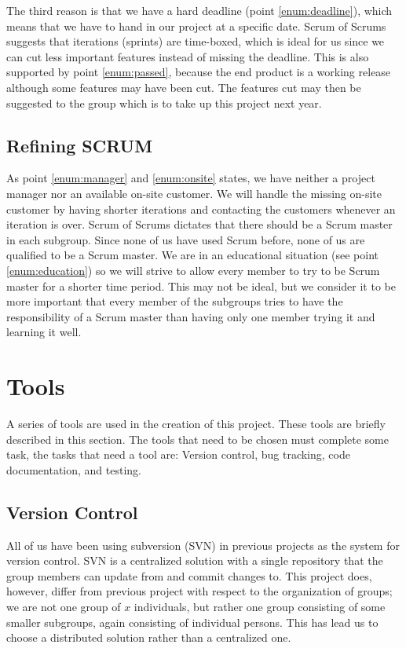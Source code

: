 The third reason is that we have a hard deadline (point \ref{enum:deadline}), which means that we have to hand in our project at a specific date.
Scrum of Scrums suggests that iterations (sprints) are time-boxed, which is ideal for us since we can cut less important features instead of missing the deadline.
This is also supported by point \ref{enum:passed}, because the end product is a working release although some features may have been cut.
The features cut may then be suggested to the group which is to take up this project next year.


\subsection{Refining SCRUM} 
\label{sub:rescrum}
As point \ref{enum:manager} and \ref{enum:onsite} states, we have neither a project manager nor an available on-site customer.
We will handle the missing on-site customer by having shorter iterations and contacting the customers whenever an iteration is over.
Scrum of Scrums\cite{scrumOfScrums} dictates that there should be a Scrum master in each subgroup.
Since none of us have used Scrum before, none of us are qualified to be a Scrum master.
We are in an educational situation (see point \ref{enum:education}) so we will strive to allow every member to try to be Scrum master for a shorter time period.
This may not be ideal, but we consider it to be more important that every member of the subgroups tries to have the responsibility of a Scrum master than having only one member trying it and learning it well.

\begin{comment}
There is more:
*Scrum board
*The phases / meetings
**estimation
**sprint planning
*Scrum meetings
*Scrum of scrum def
*project manager problem
\end{comment}


\section{Tools}\label{subsec:tools}
A series of tools are used in the creation of this project.
These tools are briefly described in this section.
The tools that need to be chosen must complete some task, the tasks that need a tool are: Version control, bug tracking, code documentation, and testing.

\subsection{Version Control}
All of us have been using subversion (SVN) in previous projects as the system for version control.
SVN is a centralized solution \cite{subversion} with a single repository that the group members can update from and commit changes to.
This project does, however, differ from previous project with respect to the organization of groups; we are not one group of $x$ individuals, but rather one group consisting of some smaller subgroups, again consisting of individual persons.
This has lead us to choose a distributed solution rather than a centralized one.

